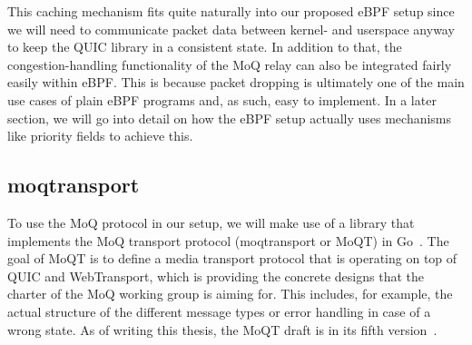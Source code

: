 This caching mechanism fits quite naturally into our proposed eBPF setup since we will need to 
communicate packet data between kernel- and userspace anyway to keep the QUIC library in a 
consistent state.
In addition to that, the congestion-handling functionality of the MoQ relay can also
be integrated fairly easily within eBPF\@.
This is because packet dropping is ultimately one of the main use cases of plain eBPF 
programs and, as such, easy to implement.
In a later section, we will go into detail on how the eBPF setup actually uses mechanisms like 
priority fields to achieve this.

\subsection{moqtransport}
To use the MoQ protocol in our setup, we will make use of a library that implements 
the MoQ transport protocol (moqtransport or MoQT) in Go~\parencite{priority-moqtransport-repo}.
The goal of MoQT is to define a media transport protocol that is operating on top
of QUIC and WebTransport, which is providing the concrete designs that the charter of 
the MoQ working group is aiming for.
This includes, for example, the actual structure of the different message types or error handling in case 
of a wrong state.
As of writing this thesis, the MoQT draft is in its fifth version~\parencite{draft-moqtransport}.
